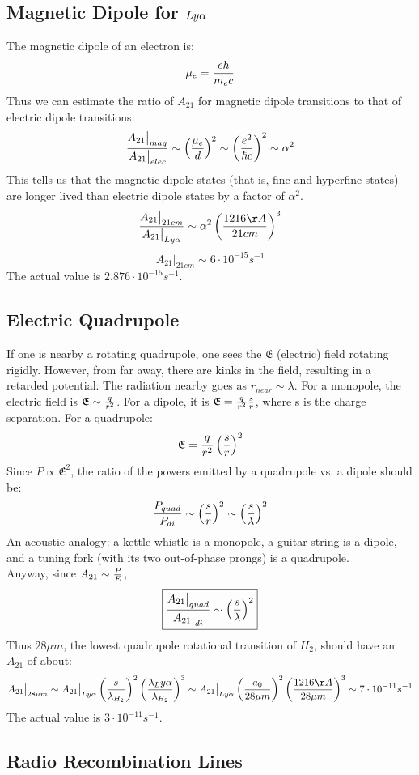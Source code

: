 \documentclass[11pt]{article}
\def\eval#1{\big|_{#1}}
\def\ato{{A_{21}}}
\def\e#1{\cdot10^{#1}}
\begin{document}
\subsection*{ Magnetic Dipole for $Ly\alpha$}

The magnetic dipole of an electron is:
$$\mu_e={e\hbar\over m_ec}$$
Thus we can estimate the ratio of $\ato$ for magnetic dipole transitions to
that of electric dipole transitions:
$${\ato\eval{mag}\over\ato\eval{elec}}\sim\left({\mu_e\over d}\right)^2
\sim\left({e^2\over\hbar c}\right)^2\sim\alpha^2$$
This tells us that the magnetic dipole states (that is, fine and hyperfine
states) are longer lived than electric dipole states by a factor of $\alpha^2$.
$${\ato\eval{21cm}\over\ato\eval{Ly\alpha}}\sim\alpha^2
\left({1216\AA\over21cm}\right)^3$$
$$\ato\eval{21cm}\sim6\e{-15}s^{-1}$$
The actual value is $2.876\e{-15}s^{-1}$.

\def\mfe{\mathfrak{E}}
\subsection*{ Electric Quadrupole}

If one is nearby a rotating quadrupole, one sees the $\mfe$  (electric)
field rotating rigidly.
However, from far away, there are kinks in the field, resulting in a retarded
potential.  The radiation nearby goes as $r_{near}\sim\lambda$.  For a monopole,
the electric field is $\mfe\sim{q\over r^2}$.  For a dipole, it is 
$\mfe={q\over r^2}
{s\over r}$, where s is the charge separation.  For a quadrupole: 
$$\mfe={q\over r^2}\left({s\over r}\right)^2$$
Since $P\propto \mfe^2$, the ratio of the powers emitted by a
quadrupole vs. a dipole should be:
$${P_{quad}\over P_{di}}\sim\left({s\over r}\right)^2
\sim\left({s\over\lambda}\right)^2$$
An acoustic analogy: a kettle whistle is a monopole, a
guitar string is a dipole, and a tuning fork (with its two out-of-phase
prongs) is a quadrupole.\\

Anyway, since $\ato\sim{P\over E}$,
$$\boxed{{\ato\eval{quad}\over\ato\eval{di}}
\sim\left({s\over\lambda}\right)^2}$$
Thus $28\mu m$, the lowest quadrupole rotational transition of
$H_2$, should have an $\ato$ of about:
$$\ato\eval{28\mu m}\sim\ato\eval\lya\left({s\over\lambda_{H_2}}\right)^2
\left({\lambda_\lya\over \lambda_{H_2}}\right)^3
\sim\ato\eval\lya\left({a_0\over 28\mu m}\right)^2
\left({1216\AA\over 28\mu m}\right)^3
\sim7\e{-11}s^{-1}$$
The actual value is $3\e{-11}s^{-1}$.

\subsection*{ Radio Recombination Lines}
\end{document}
